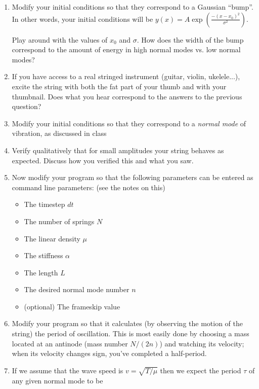 \documentclass[12pt]{article}
\begin{document}
\begin{enumerate}

\item Modify your initial conditions so that they correspond to a Gaussian ``bump''. In other words, your initial conditions will be $y(x) = A \exp \left( \frac{-(x-x_0)^2}{\sigma^2} \right).$

Play around with the values of $x_0$ and $\sigma$. How does the width of the bump correspond to the amount of energy in high normal modes vs. low normal modes?

\item If you have access to a real stringed instrument (guitar, violin, ukelele...), excite the string with both the fat part of your thumb and with your thumbnail. Does what you hear correspond to the answers
to the previous question?

\item{Modify your initial conditions so that they correspond to a {\it normal mode} of vibration, as discussed in class}
\item{Verify qualitatively that for small amplitudes your string behaves as expected. Discuss how you verified this and what you saw.}
\item Now modify your program so that the following parameters can be entered as command line parameters: (see the notes on this)

\begin{itemize}
\item The timestep $dt$
\item The number of springs $N$
\item The linear density $\mu$
\item The stiffness $\alpha$
\item The length $L$
\item The desired normal mode number $n$
\item (optional) The frameskip value
\end{itemize}

\item Modify your program so that it calculates (by observing the motion of the string) the period of oscillation. This is most easily done by choosing a mass located at an antinode
(mass number $N/(2n)$) and watching its velocity; when its velocity changes sign, you've completed a half-period. 

\item If we assume that the wave speed is $v=\sqrt{T/\mu}$ then we expect the period $\tau$ of any given normal mode to be


\end{enumerate}
\end{document}
